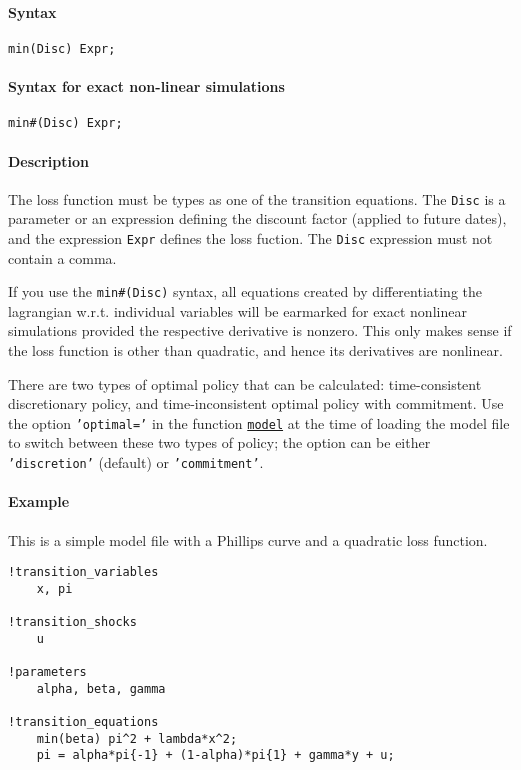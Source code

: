 


	\paragraph{Syntax}\label{syntax}

\begin{verbatim}
min(Disc) Expr;
\end{verbatim}

\paragraph{Syntax for exact non-linear
simulations}\label{syntax-for-exact-non-linear-simulations}

\begin{verbatim}
min#(Disc) Expr;
\end{verbatim}

\paragraph{Description}\label{description}

The loss function must be types as one of the transition equations. The
\texttt{Disc} is a parameter or an expression defining the discount
factor (applied to future dates), and the expression \texttt{Expr}
defines the loss fuction. The \texttt{Disc} expression must not contain
a comma.

If you use the \texttt{min\#(Disc)} syntax, all equations created by
differentiating the lagrangian w.r.t. individual variables will be
earmarked for exact nonlinear simulations provided the respective
derivative is nonzero. This only makes sense if the loss function is
other than quadratic, and hence its derivatives are nonlinear.

There are two types of optimal policy that can be calculated:
time-consistent discretionary policy, and time-inconsistent optimal
policy with commitment. Use the option \texttt{'optimal='} in the
function \href{model/model}{\texttt{model}} at the time of loading the
model file to switch between these two types of policy; the option can
be either \texttt{'discretion'} (default) or \texttt{'commitment'}.

\paragraph{Example}\label{example}

This is a simple model file with a Phillips curve and a quadratic loss
function.

\begin{verbatim}
!transition_variables
    x, pi

!transition_shocks
    u

!parameters
    alpha, beta, gamma

!transition_equations
    min(beta) pi^2 + lambda*x^2;
    pi = alpha*pi{-1} + (1-alpha)*pi{1} + gamma*y + u;
\end{verbatim}


